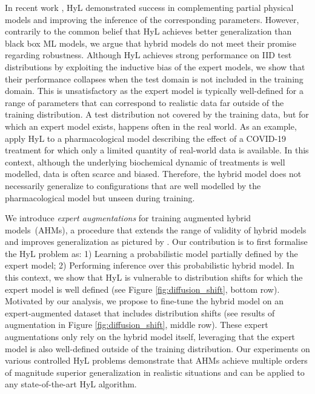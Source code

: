 In recent work \citep{APHYNITY, HVAE, latent_ode_pharma, hl_1, hl_2, hl_3}, HyL demonstrated success in complementing partial physical models and improving the inference of the corresponding parameters. However, contrarily to the common belief that HyL achieves better generalization than black box ML models, we argue that hybrid models do not meet their promise regarding robustness. Although HyL achieves strong performance on IID test distributions by exploiting the inductive bias of the expert models, we show that their performance collapses when the test domain is not included in the training domain. This is unsatisfactory as the expert model is typically well-defined for a range of parameters that can correspond to realistic data far outside of the training distribution. A test distribution not covered by the training data, but for which an expert model exists, happens often in the real world. As an example, \citet{latent_ode_pharma} apply HyL to a pharmacological model describing the effect of a COVID-19 treatment for which only a limited quantity of real-world data is available. In this context, although the underlying biochemical dynamic of treatments is well modelled, data is often scarce and biased. Therefore, the hybrid model does not necessarily generalize to configurations that are well modelled by the pharmacological model but unseen during training.

We introduce \textit{expert augmentations} for training augmented hybrid models~(AHMs), a procedure that extends the range of validity of hybrid models and improves generalization as pictured by . Our contribution is to first formalise the HyL problem as: 1) Learning a probabilistic model partially defined by the expert model; 2) Performing inference over this probabilistic hybrid model. In this context, we show that HyL is vulnerable to distribution shifts for which the expert model is well defined (see Figure \ref{fig:diffusion_shift}, bottom row). Motivated by our analysis, we propose to fine-tune the hybrid model on an expert-augmented dataset that includes distribution shifts (see results of augmentation in Figure \ref{fig:diffusion_shift}, middle row). These expert augmentations only rely on the hybrid model itself, leveraging that the expert model is also well-defined outside of the training distribution. Our experiments on various controlled HyL problems demonstrate that AHMs achieve multiple orders of magnitude superior generalization in realistic situations and can be applied to any state-of-the-art HyL algorithm.

